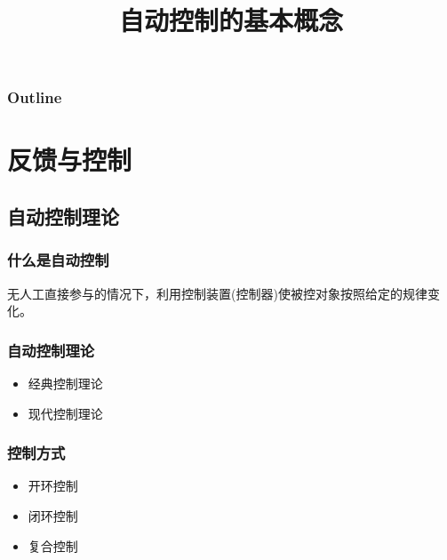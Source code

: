 \documentclass{article}
\title{自动控制的基本概念}
\author{}
\date{}
\begin{document}
\maketitle

\begin{frame}
\frametitle{Outline}
\setcounter{tocdepth}{3}
\tableofcontents
\end{frame}












\section{反馈与控制}
\label{sec-1}
\subsection{自动控制理论}
\label{sec-1-1}
\begin{frame}
\frametitle{什么是自动控制}
\label{sec-1-1-1}

 无人工直接参与的情况下，利用控制装置(控制器)使被控对象按照给定的规律变化。
\end{frame}
\begin{frame}
\frametitle{自动控制理论}
\label{sec-1-1-2}

\begin{itemize}
\item <2->经典控制理论
\item <3->现代控制理论
\end{itemize}
\end{frame}
\begin{frame}
\frametitle{控制方式}
\label{sec-1-1-3}

\begin{itemize}
\item 开环控制
\item 闭环控制
\item 复合控制
\end{itemize}
\end{frame}
\end{document}
